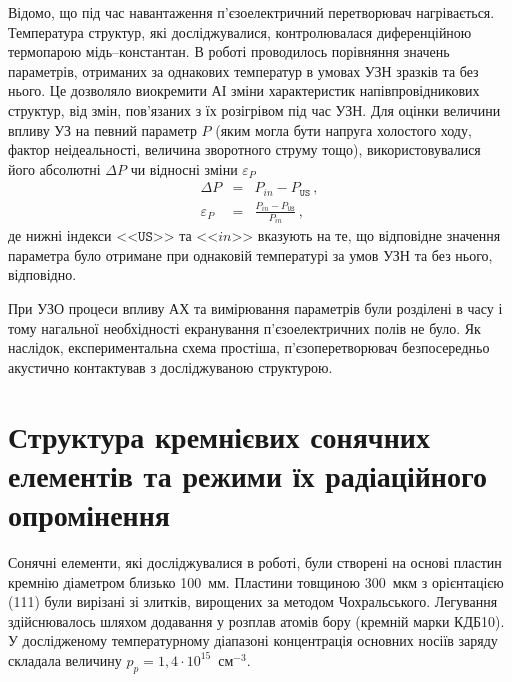 Відомо, що під час навантаження п'єзоелектричний перетворювач нагрівається.
Температура структур, які досліджувалися, контролювалася диференційною термопарою мідь--константан.
В роботі проводилось порівняння значень параметрів, отриманих за однакових температур в умовах УЗН зразків та без нього.
Це дозволяло виокремити АІ зміни характеристик напівпровідникових структур, від змін, пов'язаних з їх розігрівом під час УЗН.
Для оцінки величини впливу УЗ на певний параметр $P$ (яким могла бути напруга холостого ходу, фактор неідеальності, величина зворотного струму тощо),
використовувалися його абсолютні
$\Delta P$ чи відносні зміни $\varepsilon_P$
\begin{eqnarray}
  \label{eqAbsDelta} \Delta P &=& P_{in}-P_\mathtt{US}\,, \\
  \label{eqEpsDelta} \varepsilon_P &=& \frac{P_{in}-P_\mathtt{US}}{P_{in}}\,,
\end{eqnarray}
де нижні індекси <<$\mathtt{US}$>> та <<$in$>> вказують на те, що відповідне значення параметра було отримане при однаковій температурі за умов УЗН та без нього, відповідно.

При УЗО процеси впливу АХ та вимірювання параметрів були розділені в часу і тому нагальної необхідності екранування п'єзоелектричних полів не було.
Як наслідок, експериментальна схема простіша, п'єзоперетворювач безпосередньо акустично контактував з досліджуваною структурою.




\section{Структура кремнієвих сонячних елементів та режими їх радіаційного опромінення\label{SSC}}
Сонячні елементи, які досліджувалися в роботі, були створені на основі пластин кремнію діаметром близько 100~мм.
Пластини  товщиною 300~мкм з орієнтацією (111) були вирізані зі злитків, вирощених за методом Чохральського.
Легування здійснювалось шляхом додавання у розплав атомів бору (кремній марки КДБ10).
У дослідженому температурному діапазоні концентрація основних носіїв заряду складала величину $p_p=1,4\cdot10^{15}$~см$^{-3}$.

